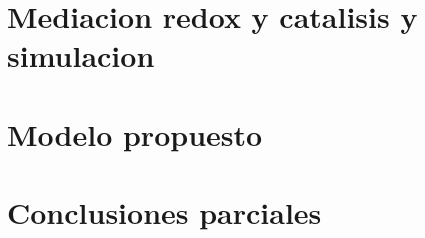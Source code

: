 \section{Mediacion redox y catalisis y simulacion}

\section{Modelo propuesto}

\section{Conclusiones parciales}





	



